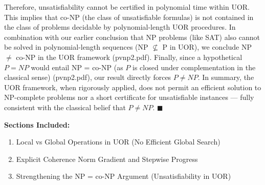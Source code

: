 \documentclass[11pt]{article}
\begin{document}
Therefore, unsatisfiability cannot be certified in polynomial time within UOR. This implies that co-NP (the class of unsatisfiable formulas) is not contained in the class of problems decidable by polynomial-length UOR procedures. In combination with our earlier conclusion that NP problems (like SAT) also cannot be solved in polynomial-length sequences (NP \(\not\subseteq\) P in UOR), we conclude NP \(\neq\) co-NP in the UOR framework (pvnp2.pdf). Finally, since a hypothetical \(P=NP\) would entail NP = co-NP (as \(P\) is closed under complementation in the classical sense) (pvnp2.pdf), our result directly forces \(P \neq NP\). In summary, the UOR framework, when rigorously applied, does not permit an efficient solution to NP-complete problems nor a short certificate for unsatisfiable instances --- fully consistent with the classical belief that \(P \neq NP\). \(\blacksquare\)

\vspace{1em}

\noindent\textbf{Sections Included:}
\begin{enumerate}[label=\arabic*.]
    \item Local vs Global Operations in UOR (No Efficient Global Search)
    \item Explicit Coherence Norm Gradient and Stepwise Progress
    \item Strengthening the NP = co-NP Argument (Unsatisfiability in UOR)
\end{enumerate}
\end{document}
